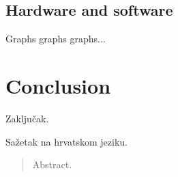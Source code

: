 \documentclass[times, utf8, diplomski]{fer}
\begin{document}
\section{Hardware and software}
Graphs graphs graphs...

\chapter{Conclusion}
Zaključak.





\begin{sazetak}
Sažetak na hrvatskom jeziku.

\end{sazetak}

\begin{abstract}
Abstract.

\end{abstract}
\end{document}
